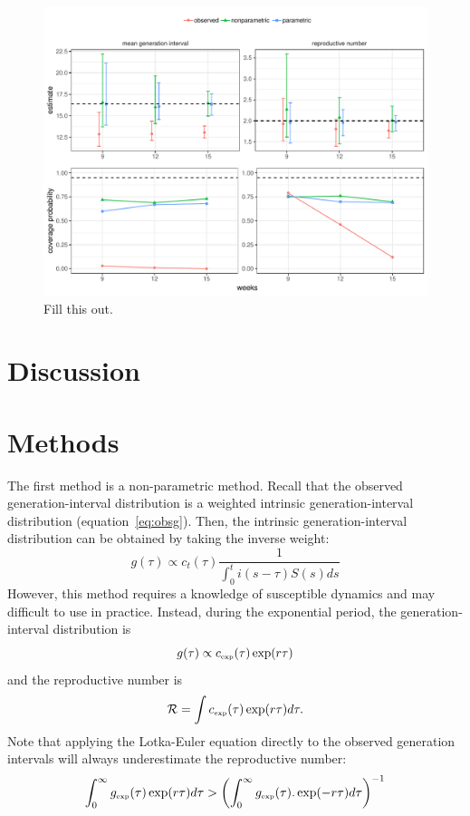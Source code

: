 \documentclass[12pt]{article}
\newcommand{\RR}{\ensuremath{{\mathcal R}}}
\newcommand{\tsub}[2]{#1_{{\textrm{\tiny #2}}}}
\begin{document}
\begin{figure}
\includegraphics[width=\textwidth]{../fig/compare_methods.pdf}
\caption{Fill this out.}
\label{fig:test}
\end{figure}

\clearpage

\section{Discussion}

\section{Methods}

The first method is a non-parametric method.
Recall that the observed generation-interval distribution is a weighted intrinsic generation-interval distribution (equation~\ref{eq:obsg}). 
Then, the intrinsic generation-interval distribution can be obtained by taking the inverse weight:
\begin{equation}
g(\tau) \propto c_t(\tau) \frac{1}{\int_{0}^t i(s-\tau) S(s) ds}
\end{equation}
However, this method requires a knowledge of susceptible dynamics and may difficult to use in practice.
Instead, during the exponential period, the generation-interval distribution is
\begin{equation}
g(\tau) \propto \tsub{c}{exp}(\tau) \exp(r\tau)
\end{equation}
and the reproductive number is
\begin{equation}
\RR = \int \tsub{c}{exp}(\tau) \exp(r\tau) d\tau.
\end{equation}
Note that applying the Lotka-Euler equation directly to the observed generation intervals will always underestimate the reproductive number:
\begin{equation}
\int_0^\infty \tsub{g}{exp}(\tau) \exp(r\tau) d\tau > \left(\int_0^\infty \tsub{g}{exp}(\tau). \exp(-r\tau) d\tau\right)^{-1}
\end{equation}
\end{document}
